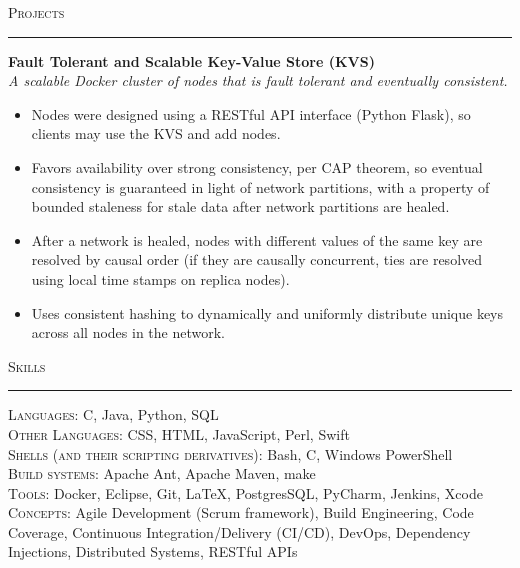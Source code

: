 \documentclass{res}
\begin{document}
\begin{resume}
\textsc{{\Large Projects}}
\vspace{0.5mm}
\hrule width18.5cm
\textbf{Fault Tolerant and Scalable Key-Value Store (KVS)}\\
\textit{A scalable Docker cluster of nodes that is fault tolerant and eventually consistent.}
	\vspace{2mm}
	\begin{itemize}
		\item Nodes were designed using a RESTful API interface (Python Flask), so clients may use the KVS and add nodes.
		\item Favors availability over strong consistency, per CAP theorem, so eventual consistency is guaranteed in light of network partitions, with a property of bounded staleness for stale data after network partitions are healed.
		\item After a network is healed, nodes with different values of the same key are resolved by causal order (if they are causally concurrent, ties are resolved using local time stamps on replica nodes).
		\item Uses consistent hashing to dynamically and uniformly distribute unique keys across all nodes in the network.
	\end{itemize}

\textsc{{\Large Skills}}
\vspace{0.5mm}
\hrule width18.5cm
	\textsc{Languages:} C, Java, Python, SQL\\[2mm]
  \textsc{Other Languages:} CSS, HTML, JavaScript, Perl, Swift\\[2mm]
  \textsc{Shells (and their scripting derivatives):} Bash, C, Windows PowerShell\\[2mm]
  \textsc{Build systems:} Apache Ant, Apache Maven, make\\[2mm]
  \textsc{Tools:} Docker, Eclipse, Git, \LaTeX, PostgresSQL, PyCharm, Jenkins, Xcode\\[2mm]
  \textsc{Concepts:} Agile Development (Scrum framework), Build Engineering, Code Coverage, Continuous Integration/Delivery (CI/CD), DevOps, Dependency Injections, Distributed Systems, RESTful APIs\\[0.5mm]
\vspace{-2mm}
\end{resume}
\end{document}

